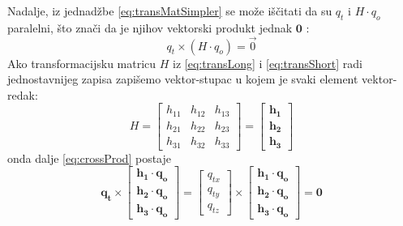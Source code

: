 Nadalje, iz jednadžbe \eqref{eq:transMatSimpler} se može iščitati da su $q_t$ i $H \cdot q_o$ paralelni, što znači da je njihov vektorski produkt jednak $\mathbf{0}$ \citep{vecParallel}:
\begin{equation}
\label{eq:crossProd}
q_t \times (H \cdot q_o) = \vec{0}
\end{equation}
Ako transformacijsku matricu $H$ iz \eqref{eq:transLong} i \eqref{eq:transShort} radi jednostavnijeg zapisa zapišemo vektor-stupac u kojem je svaki element vektor-redak:
\begin{equation}
H = \left[
\begin{matrix}
h_{11} & h_{12} & h_{13} \\
h_{21} & h_{22} & h_{23} \\
h_{31} & h_{32} & h_{33}
\end{matrix}
\right]
= \left[
\begin{matrix}
\mathbf {h_1} \\
\mathbf{h_2} \\
\mathbf{h_3}
\end{matrix}
\right]
\end{equation}
onda dalje \eqref{eq:crossProd} postaje
\begin{equation}
\label{eq:transCrossProdLong}
\mathbf{q_t} \times \left[
\begin{matrix}
\mathbf {h_1} \cdot \mathbf{q_o} \\
\mathbf{h_2} \cdot \mathbf{q_o} \\
\mathbf{h_3} \cdot \mathbf{q_o}
\end{matrix}
\right]
= \left[
\begin{matrix}
q_{tx} \\
q_{ty} \\
q_{tz}
\end{matrix}
\right]
\times \left[
\begin{matrix}
\mathbf {h_1} \cdot \mathbf{q_o} \\
\mathbf{h_2} \cdot \mathbf{q_o} \\
\mathbf{h_3} \cdot \mathbf{q_o}
\end{matrix}
\right]
= \mathbf{0}
\end{equation}

